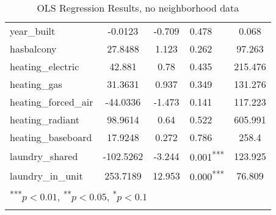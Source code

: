 \documentclass[12pt]{report}
\begin{document}
\begin{longtable}{l S[table-format=6.4] S[table-format=3.4] l S[table-format=4.4]}
	year\_built                  & -0.0123              & -0.709           & 0.478                      & 0.068                             \\
	hasbalcony                   & 27.8488              & 1.123            & 0.262                      & 97.263                            \\
	heating\_electric            & 42.881               & 0.78             & 0.435                      & 215.476                           \\
	heating\_gas                 & 31.3631              & 0.937            & 0.349                      & 131.276                           \\
	heating\_forced\_air         & -44.0336             & -1.473           & 0.141                      & 117.223                           \\
	heating\_radiant             & 98.9614              & 0.64             & 0.522                      & 605.991                           \\
	heating\_baseboard           & 17.9248              & 0.272            & 0.786                      & 258.4                             \\
	laundry\_shared              & -102.5262            & -3.244           & 0.001\textsuperscript{***} & 123.925                           \\
	laundry\_in\_unit            & 253.7189             & 12.953           & 0.000\textsuperscript{***} & 76.809                            \\
	                             \\
	\caption{OLS Regression Results, no neighborhood data}
	\label{table:ols_with_neighborhood}
\end{longtable}
\end{document}
